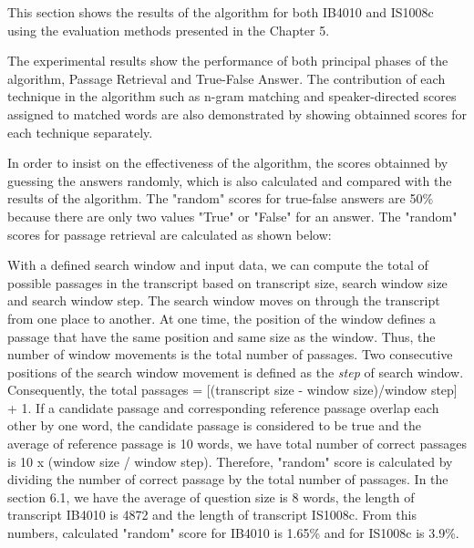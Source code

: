 This section shows the results of the algorithm for both IB4010 and IS1008c using the evaluation methods presented in the Chapter 5.

The experimental results show the performance of both principal phases of the algorithm, Passage Retrieval and True-False Answer. The contribution of each technique in the algorithm such as n-gram matching and speaker-directed scores assigned to matched words are also demonstrated by showing obtainned scores for each technique separately. 

In order to insist on the effectiveness of the algorithm, the scores obtainned by guessing the answers randomly, which is also calculated and compared with the results of the algorithm. The "random" scores for true-false answers are 50\% because there are only two values "True" or "False" for an answer. The "random" scores for passage retrieval are calculated as shown below:

With a defined search window and input data, we can compute the total of possible passages in the transcript based on transcript size, search window size and search window step. The search window moves on through the transcript from one place to another. At one time, the position of the window defines a passage that have the same position and same size as the window. Thus, the number of window movements is the total number of passages. Two consecutive positions of the search window movement is defined as the \textit{step} of search window. Consequently, the total passages = [(transcript size - window size)/window step] + 1.  If a candidate passage and corresponding reference passage overlap each other by one word, the candidate passage is considered to be true and the average of reference passage is 10 words, we have total number of correct passages is 10 x (window size / window step). Therefore, "random" score is calculated by dividing the number of correct passage by the total number of passages. In the section 6.1, we have the average of question size is 8 words, the length of transcript IB4010 is 4872 and the length of transcript IS1008c. From this numbers, calculated "random" score for IB4010 is 1.65\% and for IS1008c is 3.9\%.

%
%
%


